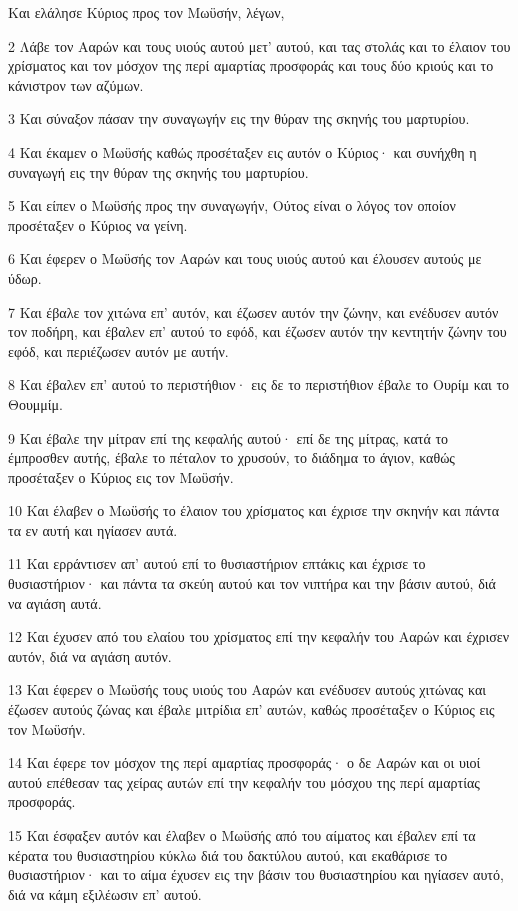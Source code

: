 \par Και ελάλησε Κύριος προς τον Μωϋσήν, λέγων,
\par 2 Λάβε τον Ααρών και τους υιούς αυτού μετ' αυτού, και τας στολάς και το έλαιον του χρίσματος και τον μόσχον της περί αμαρτίας προσφοράς και τους δύο κριούς και το κάνιστρον των αζύμων.
\par 3 Και σύναξον πάσαν την συναγωγήν εις την θύραν της σκηνής του μαρτυρίου.
\par 4 Και έκαμεν ο Μωϋσής καθώς προσέταξεν εις αυτόν ο Κύριος· και συνήχθη η συναγωγή εις την θύραν της σκηνής του μαρτυρίου.
\par 5 Και είπεν ο Μωϋσής προς την συναγωγήν, Ούτος είναι ο λόγος τον οποίον προσέταξεν ο Κύριος να γείνη.
\par 6 Και έφερεν ο Μωϋσής τον Ααρών και τους υιούς αυτού και έλουσεν αυτούς με ύδωρ.
\par 7 Και έβαλε τον χιτώνα επ' αυτόν, και έζωσεν αυτόν την ζώνην, και ενέδυσεν αυτόν τον ποδήρη, και έβαλεν επ' αυτού το εφόδ, και έζωσεν αυτόν την κεντητήν ζώνην του εφόδ, και περιέζωσεν αυτόν με αυτήν.
\par 8 Και έβαλεν επ' αυτού το περιστήθιον· εις δε το περιστήθιον έβαλε το Ουρίμ και το Θουμμίμ.
\par 9 Και έβαλε την μίτραν επί της κεφαλής αυτού· επί δε της μίτρας, κατά το έμπροσθεν αυτής, έβαλε το πέταλον το χρυσούν, το διάδημα το άγιον, καθώς προσέταξεν ο Κύριος εις τον Μωϋσήν.
\par 10 Και έλαβεν ο Μωϋσής το έλαιον του χρίσματος και έχρισε την σκηνήν και πάντα τα εν αυτή και ηγίασεν αυτά.
\par 11 Και ερράντισεν απ' αυτού επί το θυσιαστήριον επτάκις και έχρισε το θυσιαστήριον· και πάντα τα σκεύη αυτού και τον νιπτήρα και την βάσιν αυτού, διά να αγιάση αυτά.
\par 12 Και έχυσεν από του ελαίου του χρίσματος επί την κεφαλήν του Ααρών και έχρισεν αυτόν, διά να αγιάση αυτόν.
\par 13 Και έφερεν ο Μωϋσής τους υιούς του Ααρών και ενέδυσεν αυτούς χιτώνας και έζωσεν αυτούς ζώνας και έβαλε μιτρίδια επ' αυτών, καθώς προσέταξεν ο Κύριος εις τον Μωϋσήν.
\par 14 Και έφερε τον μόσχον της περί αμαρτίας προσφοράς· ο δε Ααρών και οι υιοί αυτού επέθεσαν τας χείρας αυτών επί την κεφαλήν του μόσχου της περί αμαρτίας προσφοράς.
\par 15 Και έσφαξεν αυτόν και έλαβεν ο Μωϋσής από του αίματος και έβαλεν επί τα κέρατα του θυσιαστηρίου κύκλω διά του δακτύλου αυτού, και εκαθάρισε το θυσιαστήριον· και το αίμα έχυσεν εις την βάσιν του θυσιαστηρίου και ηγίασεν αυτό, διά να κάμη εξιλέωσιν επ' αυτού.
